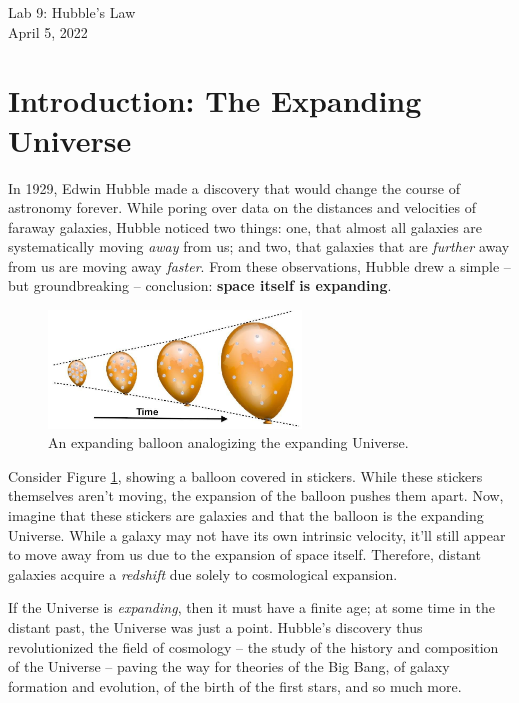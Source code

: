 \documentclass[11pt]{article}
\begin{document}
\begin{center}
\huge{Lab 9: Hubble's Law}\\ \medskip \Large{April 5, 2022}
\end{center}

\section{Introduction: The Expanding Universe}
In 1929, Edwin Hubble made a discovery that would change the course of astronomy forever. While poring over data on the distances and velocities of faraway galaxies, Hubble noticed two things: one, that almost all galaxies are systematically moving \emph{away} from us; and two, that galaxies that are \emph{further} away from us are moving away \emph{faster}. From these observations, Hubble drew a simple -- but groundbreaking -- conclusion: \textbf{space itself is expanding}.  

\begin{figure}[h!]
    \centering
    \includegraphics[width=0.6\textwidth]{expanding balloon.jpg}
    \caption{An expanding balloon analogizing the expanding Universe.}
    \label{fig:balloon}
\end{figure}

Consider Figure \ref{fig:balloon}, showing a balloon covered in stickers. While these stickers themselves aren't moving, the expansion of the balloon pushes them apart. Now, imagine that these stickers are galaxies and that the balloon is the expanding Universe. While a galaxy may not have its own intrinsic velocity, it'll still appear to move away from us due to the expansion of space itself. Therefore, distant galaxies acquire a \emph{redshift} due solely to cosmological expansion.

If the Universe is \emph{expanding}, then it must have a finite age; at some time in the distant past, the Universe was just a point. Hubble's discovery thus revolutionized the field of cosmology -- the study of the history and composition of the Universe -- paving the way for theories of the Big Bang, of galaxy formation and evolution, of the birth of the first stars, and so much more.
\medskip
\end{document}
